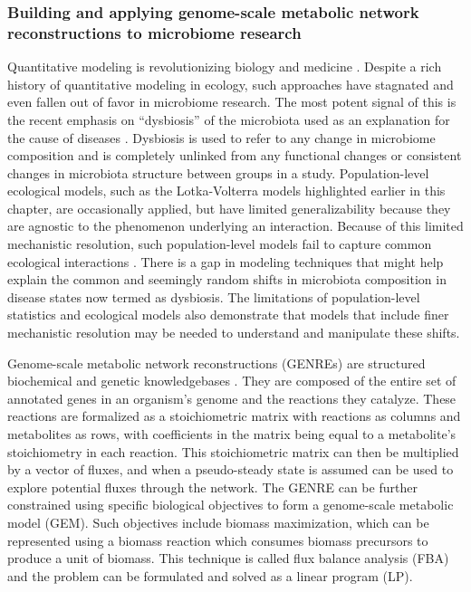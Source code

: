 \documentclass[11pt,twocolumn,notitlepage,openany,twoside]{book}
\begin{document}
\begin{refsection}
\subsubsection{Building and applying genome-scale metabolic network reconstructions to microbiome research}

Quantitative modeling is revolutionizing biology and medicine \cite{Kitano2002-az}. Despite a rich history of quantitative modeling in ecology, such approaches have stagnated and even fallen out of favor in microbiome research. The most potent signal of this is the recent emphasis on “dysbiosis” of the microbiota used as an explanation for the cause of diseases \cite{Olesen2016-uu}. Dysbiosis is used to refer to any change in microbiome composition and is completely unlinked from any functional changes or consistent changes in microbiota structure between groups in a study. Population-level ecological models, such as the Lotka-Volterra models highlighted earlier in this chapter, are occasionally applied, but have limited generalizability because they are agnostic to the phenomenon underlying an interaction. Because of this limited mechanistic resolution, such population-level models fail to capture common ecological interactions \cite{Momeni2017-it}. There is a gap in modeling techniques that might help explain the common and seemingly random shifts in microbiota composition in disease states now termed as dysbiosis. The limitations of population-level statistics and ecological models also demonstrate that models that include finer mechanistic resolution may be needed to understand and manipulate these shifts.

Genome-scale metabolic network reconstructions (GENREs) are structured biochemical and genetic knowledgebases \cite{Oberhardt2009-iu}. They are composed of the entire set of annotated genes in an organism’s genome and the reactions they catalyze. These reactions are formalized as a stoichiometric matrix with reactions as columns and metabolites as rows, with coefficients in the matrix being equal to a metabolite’s stoichiometry in each reaction. This stoichiometric matrix can then be multiplied by a vector of fluxes, and when a pseudo-steady state is assumed can be used to explore potential fluxes through the network. The GENRE can be further constrained using specific biological objectives to form a genome-scale metabolic model (GEM). Such objectives include biomass maximization, which can be represented using a biomass reaction which consumes biomass precursors to produce a unit of biomass. This technique is called flux balance analysis (FBA) and the problem can be formulated and solved as a linear program (LP).


\end{refsection}
\end{document}
